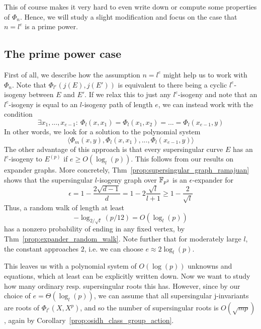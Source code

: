 This of course makes it very hard to even write down or compute some properties of $\Phi_n$.
Hence, we will study a slight modification and focus on the case that $n = l^e$ is a prime power.

\subsection{The prime power case}
First of all, we describe how the assumption $n = l^e$ might help us to work with $\Phi_n$.
Note that $\Phi_{l^e}(j(E), j(E'))$ is equivalent to there being a cyclic $l^e$-isogeny between $E$ and $E'$.
If we relax this to just any $l^e$-isogeny and note that an $l^e$-isogeny is equal to an $l$-isogeny path of length $e$, we can instead work with the condition
\begin{equation*}
    \exists x_1, ..., x_{e - 1}: \ \Phi_l(x, x_1) = \Phi_l(x_1, x_2) = ... = \Phi_l(x_{e - 1}, y)
\end{equation*}
In other words, we look for a solution to the polynomial system
\begin{equation*}
    \langle \Phi_m(x, y), \Phi_l(x, x_1), ..., \Phi_l(x_{e - 1}, y) \rangle
\end{equation*}
The other advantage of this approach is that every supersingular curve $E$ has an $l^e$-isogeny to $E^{(p)}$ if $e \geq O(\log_l(p))$.
This follows from our results on expander graphs.
More concretely, Thm~\ref{prop:supersingular_graph_ramajuan} shows that the supersingular $l$-isogeny graph over $\mathbb{F}_{p^2}$ is an $\epsilon$-expander for
\begin{equation*}
    \epsilon = 1 - \frac {2\sqrt{d - 1}} d = 1 - 2 \frac {\sqrt{l}} {l + 1} \geq 1 - \frac 2 {\sqrt{l}}
\end{equation*}
Thus, a random walk of length at least
\begin{equation*}
    -\log_{2/\sqrt{l}}(p/12) = O(\log_l(p))
\end{equation*}
has a nonzero probability of ending in any fixed vertex, by Thm~\ref{prop:expander_random_walk}.
Note further that for moderately large $l$, the constant approaches $2$, i.e. we can choose $e \approx 2\log_l(p)$.

This leaves us with a polynomial system of $O(\log(p))$ unknowns and equations, which at least can be explicitly written down.
Now we want to study how many ordinary resp. supersingular roots this has.
However, since by our choice of $e = \Theta(\log_l(p))$, we can assume that all supersingular j-invariants are roots of $\Phi_{l^e}(X, X^p)$, and so the number of supersingular roots is $O(\sqrt{mp})$, again by Corollary~\ref{prop:osidh_class_group_action}.

